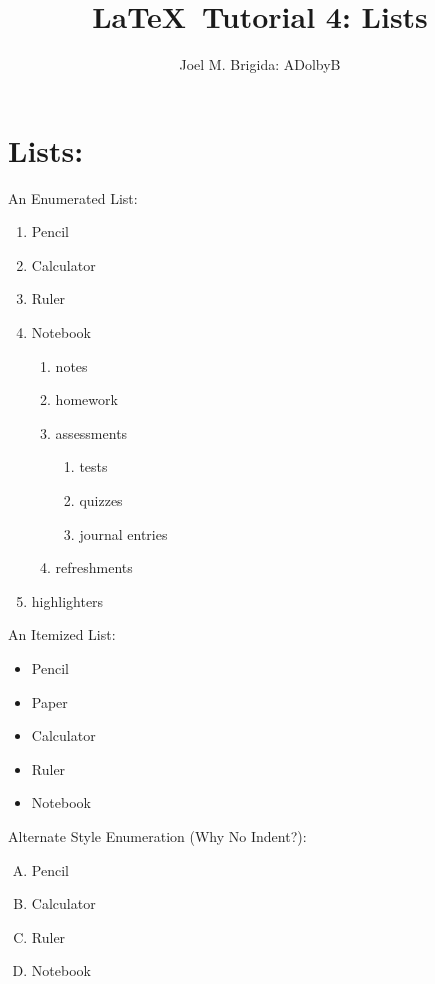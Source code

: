 \documentclass[11pt]{article}
\begin{document}
\title{\LaTeX\ Tutorial 4: Lists}
\author{Joel M. Brigida: ADolbyB}
\maketitle %

\section{Lists:}
\thispagestyle{empty} %

An Enumerated List:
\begin{enumerate}
    \item Pencil
    \item Calculator
    \item Ruler
    \item Notebook
    \begin{enumerate}
        \item notes
        \item homework
        \item assessments
        \begin{enumerate}
            \item tests
            \item quizzes
            \item journal entries
        \end{enumerate}
        \item refreshments
    \end{enumerate}
\item highlighters
\end{enumerate}

\vspace{1cm}

An Itemized List:
\begin{itemize}
    \item Pencil
    \item Paper
    \item Calculator
    \item Ruler
    \item Notebook
\end{itemize}

\pagebreak

Alternate Style Enumeration (Why No Indent?):
\begin{enumerate}[A.] %
    \item Pencil
    \item Calculator
    \item Ruler
    \item Notebook
\end{enumerate}
\end{document}
